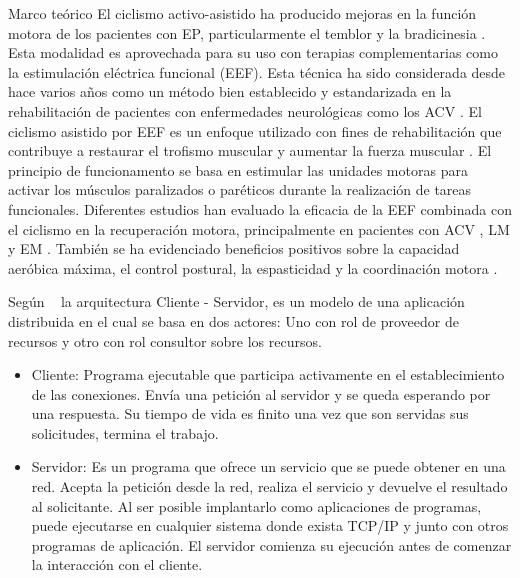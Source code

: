 \begin{thesischapter}{1} {Marco teórico}
    \vspace{5pt}
    El ciclismo activo-asistido ha producido mejoras en la función motora de los pacientes con EP, particularmente el temblor y la bradicinesia \cite{ryan2020interval, palomino2021efectividad}. Esta modalidad es aprovechada para su uso con terapias complementarias como la estimulación eléctrica funcional (EEF). Esta técnica ha sido considerada desde hace varios años como un método bien establecido y estandarizada en la rehabilitación de pacientes con enfermedades neurológicas como los ACV \cite{rabelo2018overview}. El ciclismo asistido por EEF es un enfoque utilizado con fines de rehabilitación que contribuye a restaurar el trofismo muscular y aumentar la fuerza muscular \cite{barbosa2015application, ferrante2008cycling}. El principio de funcionamento se basa en estimular las unidades motoras para activar los músculos paralizados o paréticos durante la realización de tareas funcionales. Diferentes estudios han evaluado la eficacia de la EEF combinada con el ciclismo en la recuperación motora, principalmente en pacientes con ACV \cite{ambrosini2020does}, LM \cite{casabona2020effects} y EM \cite{pilutti2019functional}. También se ha evidenciado beneficios positivos sobre la capacidad aeróbica máxima, el control postural, la espasticidad y la coordinación motora \cite{barbosa2015application, rabelo2018overview}.

    \vspace{10pt}
    Según ~\cite{moyano2020arquitectura} la arquitectura Cliente - Servidor, es  un modelo de una aplicación distribuida en el cual se basa en dos actores: Uno con rol de proveedor de recursos y otro con rol consultor sobre los recursos.
    \begin{itemize}
        \item Cliente: Programa ejecutable que participa activamente en el establecimiento de las conexiones. Envía una petición al servidor y se queda esperando por una respuesta. Su tiempo de vida es finito una vez que son
        servidas sus solicitudes, termina el trabajo.
        \item Servidor: Es un programa que ofrece un servicio que se puede obtener en una red. Acepta la petición desde la red, realiza el servicio y devuelve el resultado al solicitante. Al ser posible implantarlo como aplicaciones de programas, puede ejecutarse en cualquier sistema donde exista TCP/IP y junto con otros programas de aplicación. El servidor comienza su ejecución antes de comenzar la interacción con el cliente.
    \end{itemize}


\end{thesischapter}
